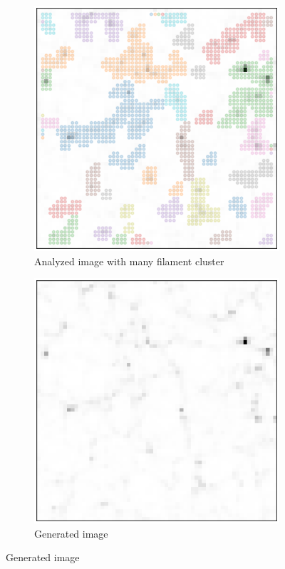 \documentclass[11pt,a4paper]{report}
\begin{document}
\begin{multicols*}{2}
    \begin{figure}[H]
        \begin{subfigure}[t]{.48\linewidth}
            \includegraphics[width=\linewidth]{./figure/clustering_filaments.png}
            \caption{Analyzed image with many filament cluster}

        \end{subfigure}
        \hfill
        \begin{subfigure}[t]{.48\linewidth}
            \includegraphics[width=\linewidth]{./figure/generated_image_cluster.png}
            \caption{Generated image}
        \end{subfigure}


\end{figure}
\end{multicols*}
\end{document}
